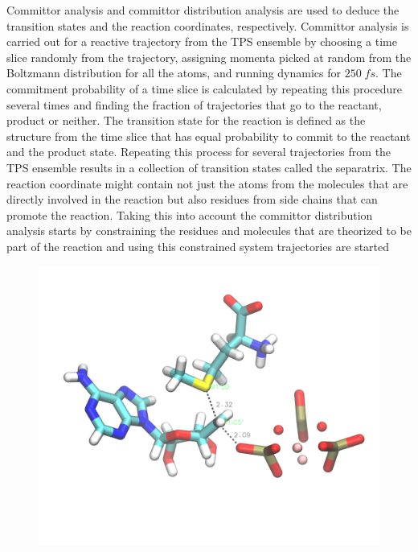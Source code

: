 \documentclass[journal=jpcbfk,manuscript=article,layout=twocolumn]{achemso}
\begin{document}
Committor analysis and committor distribution analysis are used to deduce 
the transition states and the reaction coordinates, respectively. 
Committor analysis is carried out for a reactive trajectory 
from the TPS ensemble by choosing a time slice randomly from the trajectory, assigning
momenta picked at random from the Boltzmann distribution for all the atoms, and running 
dynamics for $250\;fs$. The commitment probability of a time slice is calculated by 
repeating this procedure several times and finding the fraction of trajectories that go 
to the reactant, product or neither. The transition state for the reaction is defined as 
the structure from the time slice that has equal probability to commit to the reactant 
and the product state. Repeating this process for several trajectories from the TPS
ensemble results in a collection of transition states called the separatrix. 
The reaction coordinate might contain not just the atoms from the molecules that 
are directly involved in the reaction but also residues from side chains that can 
promote the reaction. Taking this into account the committor distribution analysis
starts by constraining the residues and molecules that are theorized to be part of the 
reaction and using this constrained system trajectories are started   

\begin{figure}[ht!]
\includegraphics[scale=0.2]{figures/mat2a-transition-state.png}
\end{figure}
\end{document}
